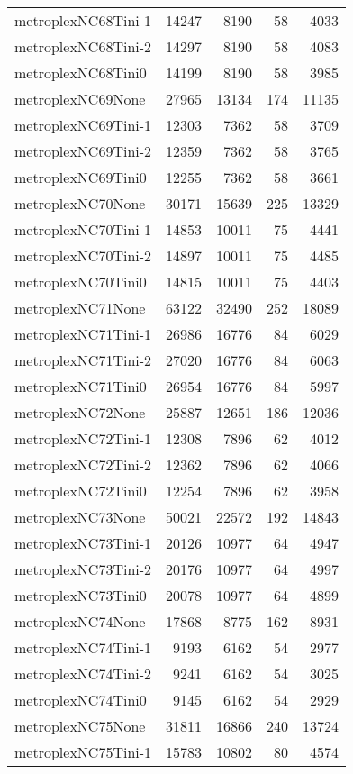 \begin{longtable}{lrrrr}
metroplexNC68Tini-1 & 14247 & 8190 & 58 & 4033 \\
metroplexNC68Tini-2 & 14297 & 8190 & 58 & 4083 \\
metroplexNC68Tini0 & 14199 & 8190 & 58 & 3985 \\
metroplexNC69None & 27965 & 13134 & 174 & 11135 \\
metroplexNC69Tini-1 & 12303 & 7362 & 58 & 3709 \\
metroplexNC69Tini-2 & 12359 & 7362 & 58 & 3765 \\
metroplexNC69Tini0 & 12255 & 7362 & 58 & 3661 \\
metroplexNC70None & 30171 & 15639 & 225 & 13329 \\
metroplexNC70Tini-1 & 14853 & 10011 & 75 & 4441 \\
metroplexNC70Tini-2 & 14897 & 10011 & 75 & 4485 \\
metroplexNC70Tini0 & 14815 & 10011 & 75 & 4403 \\
metroplexNC71None & 63122 & 32490 & 252 & 18089 \\
metroplexNC71Tini-1 & 26986 & 16776 & 84 & 6029 \\
metroplexNC71Tini-2 & 27020 & 16776 & 84 & 6063 \\
metroplexNC71Tini0 & 26954 & 16776 & 84 & 5997 \\
metroplexNC72None & 25887 & 12651 & 186 & 12036 \\
metroplexNC72Tini-1 & 12308 & 7896 & 62 & 4012 \\
metroplexNC72Tini-2 & 12362 & 7896 & 62 & 4066 \\
metroplexNC72Tini0 & 12254 & 7896 & 62 & 3958 \\
metroplexNC73None & 50021 & 22572 & 192 & 14843 \\
metroplexNC73Tini-1 & 20126 & 10977 & 64 & 4947 \\
metroplexNC73Tini-2 & 20176 & 10977 & 64 & 4997 \\
metroplexNC73Tini0 & 20078 & 10977 & 64 & 4899 \\
metroplexNC74None & 17868 & 8775 & 162 & 8931 \\
metroplexNC74Tini-1 & 9193 & 6162 & 54 & 2977 \\
metroplexNC74Tini-2 & 9241 & 6162 & 54 & 3025 \\
metroplexNC74Tini0 & 9145 & 6162 & 54 & 2929 \\
metroplexNC75None & 31811 & 16866 & 240 & 13724 \\
metroplexNC75Tini-1 & 15783 & 10802 & 80 & 4574 \\

\end{longtable}

